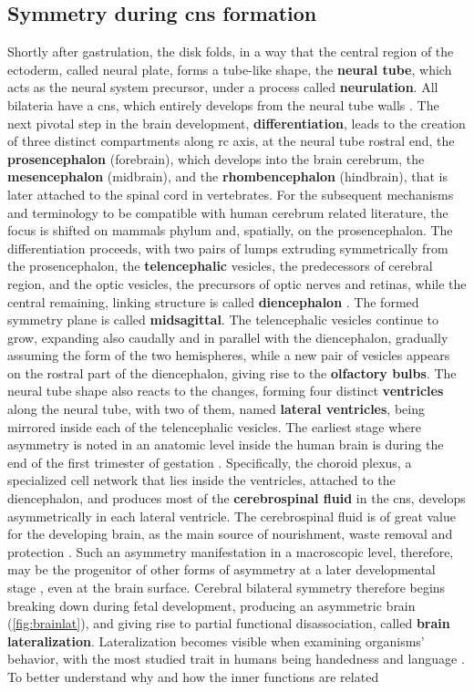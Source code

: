 \subsection{Symmetry during \acs{cns} formation}
Shortly after gastrulation, the disk folds, in a way that the central region of the ectoderm, called neural plate, forms a tube-like shape, the \textbf{neural tube}, which acts as the neural system precursor, under a process called \textbf{neurulation}. All bilateria have a \acf{cns}, which entirely develops from the neural tube walls \cite{F.Bear2016a}. The next pivotal step in the brain development, \textbf{differentiation}, leads to the creation of three distinct compartments along \ac{rc} axis, at the neural tube rostral end, the \textbf{prosencephalon} (forebrain), which develops into the brain cerebrum, the \textbf{mesencephalon} (midbrain), and the \textbf{rhombencephalon} (hindbrain), that is later attached to the spinal cord in vertebrates. For the subsequent mechanisms and terminology to be compatible with human cerebrum related literature, the focus is shifted on mammals phylum and, spatially, on the prosencephalon. The differentiation proceeds, with two pairs of lumps extruding symmetrically from the prosencephalon, the \textbf{telencephalic} vesicles, the predecessors of cerebral region, and the optic vesicles, the precursors of optic nerves and retinas, while the central remaining, linking structure is called \textbf{diencephalon} \cite{F.Bear2016b}. The formed symmetry plane is called \textbf{midsagittal}. The telencephalic vesicles continue to grow, expanding also caudally and in parallel with the diencephalon, gradually assuming the form of the two hemispheres, while a new pair of vesicles appears on the rostral part of the diencephalon, giving rise to the \textbf{olfactory bulbs}. The neural tube shape also reacts to the changes, forming four distinct \textbf{ventricles} along the neural tube, with two of them, named \textbf{lateral ventricles}, being mirrored inside each of the telencephalic vesicles. The earliest stage where asymmetry is noted in an anatomic level inside the human brain is during the end of the first trimester of gestation \cite{Abu-Rustum2013}. Specifically, the choroid plexus, a specialized cell network that lies inside the ventricles, attached to the diencephalon, and produces most of the \textbf{cerebrospinal fluid} in the \ac{cns},  develops asymmetrically in each lateral ventricle. The cerebrospinal fluid is of great value for the developing brain, as the main source of nourishment, waste removal and protection \cite{Telano2021}. Such an asymmetry manifestation in a macroscopic level, therefore, may be the progenitor of other forms of asymmetry at a later developmental stage \cite{Schmitz2019}, even at the brain surface. Cerebral bilateral symmetry therefore begins breaking down during fetal development, producing an asymmetric brain (\autoref{fig:brainlat}), and giving rise to partial functional disassociation, called \textbf{brain lateralization}. Lateralization becomes visible when examining organisms' behavior, with the most studied trait in humans being handedness and language \cite{Schmitz2019,Corballis2009}. To better understand why and how the inner functions are related 